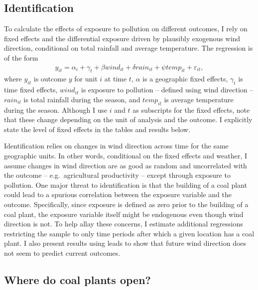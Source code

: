 \documentclass[
]{article}
\begin{document}
\hypertarget{identification}{%
\subsection{\texorpdfstring{Identification \label{identification}}{Identification }}\label{identification}}

To calculate the effects of exposure to pollution on different outcomes, I rely on fixed effects and the differential exposure driven by plausibly exogenous wind direction, conditional on total rainfall and average temperature. The regression is of the form
\begin{gather} y_{it} = \alpha_{i} + \gamma_{t} + \beta wind_{it} + \delta rain_{it} + \psi temp_{it} + \varepsilon_{it}, \end{gather}
where \(y_{it}\) is outcome \(y\) for unit \(i\) at time \(t\), \(\alpha\) is a geographic fixed effects, \(\gamma_t\) is time fixed effects, \(wind_{it}\) is exposure to pollution -- defined using wind direction -- \(rain_{it}\) is total rainfall during the season, and \(temp_{it}\) is average temperature during the season. Although I use \(i\) and \(t\) as subscripts for the fixed effects, note that these change depending on the unit of analysis and the outcome. I explicitly state the level of fixed effects in the tables and results below.

Identification relies on changes in wind direction across time for the same geographic units. In other words, conditional on the fixed effects and weather, I assume changes in wind direction are as good as random and uncorrelated with the outcome -- e.g.~agricultural productivity -- except through exposure to pollution. One major threat to identification is that the building of a coal plant could lead to a spurious correlation between the exposure variable and the outcome. Specifically, since exposure is defined as zero prior to the building of a coal plant, the exposure variable itself might be endogenous even though wind direction is not. To help allay these concerns, I estimate additional regressions restricting the sample to only time periods after which a given location has a coal plant. I also present results using leads to show that future wind direction does not seem to predict current outcomes.

\hypertarget{where-do-coal-plants-open}{%
\subsection{Where do coal plants open?}\label{where-do-coal-plants-open}}
\end{document}
